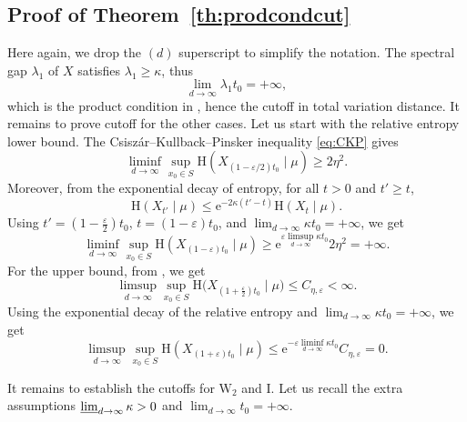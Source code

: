 \documentclass[10pt,reqno]{amsart}
\numberwithin{equation}{section}
\begin{document}
\subsection{Proof of Theorem~\ref{th:prodcondcut}} 
Here again, we drop the $(d)$ superscript to simplify the notation. The
spectral gap $\lambda_1$ of $X$ satisfies $\lambda_1\geq\kappa$, thus
\begin{equation}
    \lim_{d\to\infty}\lambda_1t_0=+\infty,
\end{equation}
which is the product condition in \cite[Cor.~1]{salez-2025}, hence the cutoff in total variation distance. It remains to prove cutoff for the other cases. Let us start with the relative entropy lower bound. The Csiszár--Kullback--Pinsker inequality \eqref{eq:CKP} gives  
\begin{equation}
 \liminf_{d\to\infty}
 \sup_{x_0\in S}
 \mathrm{H}(X_{(1-\varepsilon/2)t_0}\mid\mu) \geq 2\eta^2.
\end{equation}
Moreover, from the exponential decay of entropy, for all $t>0$ and $t'\geq t$,
\begin{equation}
\mathrm{H}(X_{t'}\mid\mu)
\leq\mathrm{e}^{-2\kappa(t'-t)}\mathrm{H}(X_{t}\mid\mu).
\end{equation}
Using $t' = (1-\frac{\varepsilon}{2})t_0$, $t = (1-\varepsilon)t_0$, and
$\lim_{d\to\infty}\kappa t_0=+\infty$, we get 
\begin{equation}
  \liminf_{d\to\infty}\sup_{x_0\in S}\mathrm{H}(X_{(1-\varepsilon)t_0}\mid\mu)
  \geq\mathrm{e}^{\varepsilon\limsup_{d\to\infty}\kappa t_0}
  2\eta^2=+\infty.
\end{equation}
For the upper bound, from \cite[Proof of Th.~1]{salez-2025}, we get
\begin{equation}
\limsup_{d\to\infty}\sup_{x_0\in S}\mathrm{H}\bigl(X_{(1+\frac{\varepsilon}{2})t_0}\mid\mu\bigr) 
\leq C_{\eta,\varepsilon}<\infty.
\end{equation}
Using the exponential decay of the relative entropy and
$\lim_{d\to\infty}\kappa t_0=+\infty$, we get
\begin{equation}
    \limsup_{d\to\infty}\sup_{x_0\in S}\mathrm{H}(X_{(1+\varepsilon)t_0}\mid\mu)
    \leq\mathrm{e}^{-\varepsilon\liminf_{d\to\infty}\kappa t_0}
    C_{\eta,\varepsilon}
    =0.
\end{equation}

It remains to establish the cutoffs for $\mathrm{W}_2$ and $\mathrm{I}$. Let
us recall the extra assumptions $\varliminf_{d\to\infty}\kappa>0$
and $\lim_{d\to\infty}t_0=+\infty$.
\end{document}
